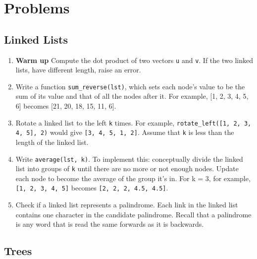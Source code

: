 \documentclass[a4paper]{book}
\begin{document}
\section{Problems}

\subsection{Linked Lists}

\begin{enumerate}
\item \textbf{Warm up} Compute the dot product of two vectors {\tt u} and {\tt v}. If the two linked lists, have different length, raise an error.
\item Write a function {\tt sum\_reverse(lst)}, which sets each node's value to be the sum of its value and that of all the nodes after it. For example, [1, 2, 3, 4, 5, 6] becomes [21, 20, 18, 15, 11, 6].
\item Rotate a linked list to the left {\tt k} times. For example, {\tt rotate\_left([1, 2, 3, 4, 5], 2)} would give {\tt [3, 4, 5, 1, 2]}. Assume that {\tt k} is less than the length of the linked list.
\item Write {\tt average(lst, k)}. To implement this: conceptually divide the linked list into groups of {\tt k} until there are no more or not enough nodes. Update each node to become the average of the group it's in. For k = 3, for example, {\tt [1, 2, 3, 4, 5]} becomes {\tt [2, 2, 2, 4.5, 4.5]}.
\item Check if a linked list represents a palindrome. Each link in the linked list contains one character in the candidate palindrome. Recall that a palindrome is any word that is read the same forwards as it is backwards.
\end{enumerate}

\subsection{Trees}
\end{document}
